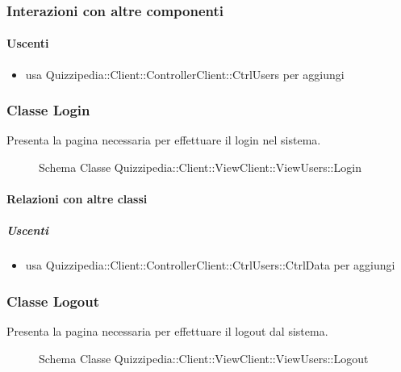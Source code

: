 \subsubsection{Interazioni con altre componenti}
\paragraph{Uscenti}
\begin{itemize}
\item usa Quizzipedia::Client::ControllerClient::CtrlUsers per aggiungi
\end{itemize}
\subsubsection{Classe Login}
Presenta la pagina necessaria per effettuare il login nel sistema.
\begin{figure}[H]
\centering
\noindent{}
\caption[Schema Classe Login]{Schema Classe Quizzipedia::Client::ViewClient::ViewUsers::Login}
\end{figure}
\paragraph{Relazioni con altre classi}
\subparagraph{Uscenti}
\begin{itemize}
\item usa Quizzipedia::Client::ControllerClient::CtrlUsers::CtrlData per aggiungi
\end{itemize}
\subsubsection{Classe Logout}
Presenta la pagina necessaria per effettuare il logout dal sistema.
\begin{figure}[H]
\centering
\noindent{}
\caption[Schema Classe Logout]{Schema Classe Quizzipedia::Client::ViewClient::ViewUsers::Logout}
\end{figure}
